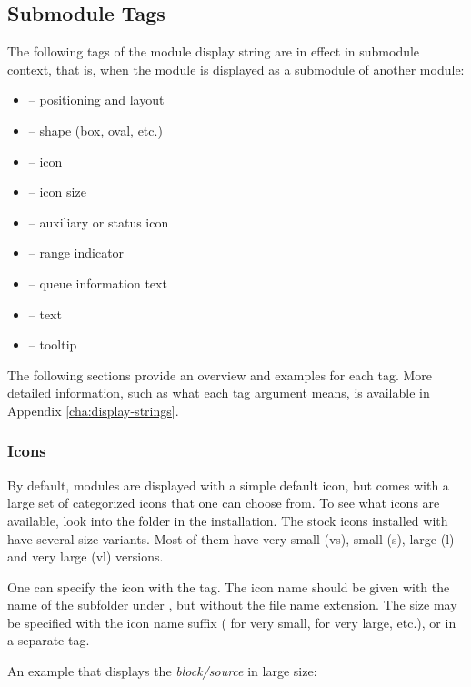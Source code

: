 \subsection{Submodule Tags}
\label{sec:graphics:submodule-displaystring-tags}

The following tags of the module display string are in effect in submodule
context, that is, when the module is displayed as a submodule of another
module:

\begin{itemize}
  \item {} -- positioning and layout
  \item {} -- shape (box, oval, etc.)
  \item {} -- icon
  \item {} -- icon size
  \item {} -- auxiliary or status icon
  \item {} -- range indicator
  \item {} -- queue information text
  \item {} -- text
  \item {} -- tooltip
\end{itemize}

The following sections provide an overview and examples for each tag. More
detailed information, such as what each tag argument means, is available in
Appendix \ref{cha:display-strings}.

\subsubsection{Icons}
\label{sec:graphics:submodule-icons}

By default, modules are displayed with a simple default icon, but {\opp}
comes with a large set of categorized icons that one can choose from.
To see what icons are available, look into the  folder
in the {\opp} installation. The stock icons installed with {\opp} have
several size variants. Most of them have very small (vs), small (s),
large (l) and very large (vl) versions.

One can specify the icon with the  tag. The icon name should be
given with the name of the subfolder under , but without the
file name extension. The size may be specified with the icon name suffix
( for very small,  for very large, etc.), or
in a separate  tag.

An example that displays the \textit{block/source} in large size:

